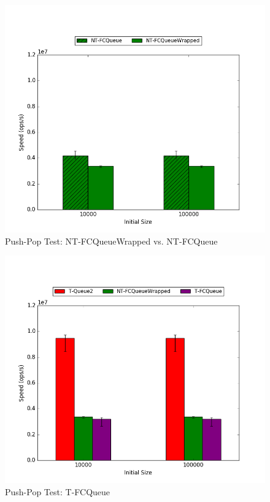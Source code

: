\begin{figure}[H]
    \centering
	\begin{minipage}{0.45\textwidth}
    \includegraphics[width=\textwidth]{fcqueues/ntQ:PushPop.png}
	\end{minipage}
	\begin{minipage}{0.45\textwidth}
    
	\end{minipage}
    \caption{Push-Pop Test: NT-FCQueueWrapped vs. NT-FCQueue}
    \label{fig:ntqs_pushpop}
\end{figure}

\begin{figure}[H]
    \centering
	\begin{minipage}{0.45\textwidth}
    \includegraphics[width=\textwidth]{fcqueues/tQ:PushPop.png}
	\end{minipage}
	\begin{minipage}{0.45\textwidth}
    
	\end{minipage}
    \caption{Push-Pop Test: T-FCQueue}
    \label{fig:tqs_pushpop}
\end{figure}

